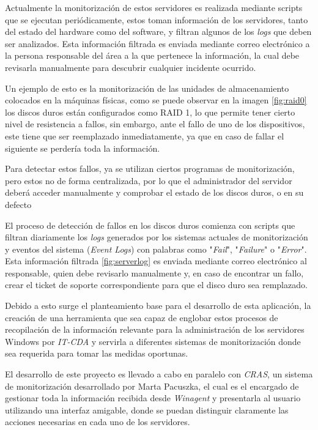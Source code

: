 Actualmente la monitorización de estos servidores es realizada mediante scripts que se ejecutan periódicamente, estos toman información de los servidores, tanto del estado del hardware como del software, y filtran algunos de los \textit{logs} que deben ser analizados. Esta información filtrada es enviada mediante correo electrónico a la persona responsable del área a la que pertenece la información, la cual debe revisarla manualmente para descubrir cualquier incidente ocurrido. 

Un ejemplo de esto es la monitorización de las unidades de almacenamiento colocados en la máquinas físicas, como se puede observar en la imagen \ref{fig:raid0} los discos duros están configurados como RAID 1, lo que permite tener cierto nivel de resistencia a fallos, sin embargo, ante el fallo de uno de los dispositivos, este tiene que ser reemplazado inmediatamente, ya que en caso de fallar el siguiente se perdería toda la información.


Para detectar estos fallos, ya se utilizan ciertos programas de monitorización, pero estos no  de forma centralizada, por lo que el administrador del servidor deberá acceder manualmente y comprobar el estado de los discos duros, o en su defecto

El proceso de detección de fallos en los discos duros comienza con scripts que filtran diariamente los \textit{logs} generados por los sistemas actuales de monitorización y eventos del sistema (\textit{Event Logs}) con palabras como "\textit{Fail}", "\textit{Failure}" o "\textit{Error}". Esta información filtrada \ref{fig:serverlog} es enviada mediante correo electrónico al responsable, quien debe revisarlo manualmente y, en caso de encontrar un fallo, crear el ticket de soporte correspondiente para que el disco duro sea remplazado.



Debido a esto surge el planteamiento base para el desarrollo de esta aplicación, la creación de una herramienta que sea capaz de englobar estos procesos de recopilación de la información relevante para la administración de los servidores Windows  por \textit{IT-CDA} y servirla a diferentes sistemas de monitorización donde sea requerida para tomar las medidas oportunas.

El desarrollo de este proyecto es llevado a cabo en paralelo con \textit{CRAS}, un sistema de monitorización desarrollado por Marta Pacuszka, el cual es el encargado de gestionar toda la información recibida desde \textit{Winagent} y presentarla al usuario utilizando una interfaz amigable, donde se puedan distinguir claramente las acciones necesarias en cada uno de los servidores.

